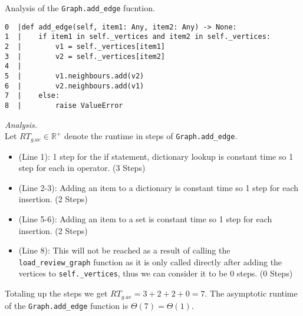\documentclass[11pt]{article}
\begin{document}
\begin{enumerate}
Analysis of the \texttt{Graph.add\_edge} fucntion.
\begin{verbatim}
0  |def add_edge(self, item1: Any, item2: Any) -> None:
1  |    if item1 in self._vertices and item2 in self._vertices:
2  |        v1 = self._vertices[item1]
3  |        v2 = self._vertices[item2]
4  |
5  |        v1.neighbours.add(v2)
6  |        v2.neighbours.add(v1)
7  |    else:
8  |        raise ValueError
\end{verbatim}
\textit{Analysis.}\\
Let $RT_{g.ae} \in \mathbb{R}^+$ denote the runtime in steps of \texttt{Graph.add\_edge}.
\begin{itemize}
    \item (Line 1): 1 step for the if statement, dictionary lookup is constant time so 1 step for each in operator. (3 Steps)
    \item (Line 2-3): Adding an item to a dictionary is constant time so 1 step for each insertion. (2 Steps)
    \item (Line 5-6): Adding an item to a set is constant time so 1 step for each insertion. (2 Steps)
    \item (Line 8): This will not be reached as a result of calling the \texttt{load\_review\_graph} function
    as it is only called directly after adding the vertices to \texttt{self.\_vertices}, thus we can consider it to be 0 steps. (0 Steps)
\end{itemize}
Totaling up the steps we get $RT_{g.ae} = 3 + 2 + 2 + 0 = 7$.  The asymptotic runtime of the \texttt{Graph.add\_edge} 
function is $\Theta(7) = \Theta(1)$.



\end{enumerate}
\end{document}
